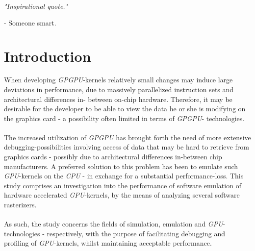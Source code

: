 \documentclass[fleqn,10pt]{SelfArx} %
\affiliation{EricNNilsson@gmail.com}
\newlength{\tocsep}
\begin{document}
\flushbottom %
\maketitle %

\noindent
\textit{"Inspirational quote."}
\begin{center}
- Someone smart.
\end{center}

\tableofcontents %
\thispagestyle{empty} %

\section*{Introduction} %
\label{sec:introduction}
When developing \textit{GPGPU}-kernels relatively small changes may induce large deviations in performance, due to massively parallelized instruction sets and architectural differences in-
between on-chip hardware. Therefore, it may be desirable for the developer to be able to view the data he or she is modifying on the graphics card - a possibility often limited in terms of \textit{GPGPU}-
technologies.\\
\\
The increased utilization of \textit{GPGPU} has brought forth the need of more extensive debugging-possibilities involving access of data that may be hard to retrieve from graphics cards - possibly due to architectural differences in-between chip manufacturers. A preferred solution to this problem has been to emulate such \textit{GPU}-kernels on the \textit{CPU} - in exchange for a substantial performance-loss. This study comprises an investigation into the performance of software emulation of hardware accelerated \textit{GPU}-kernels, by the means of analyzing several software rasterizers.\\
\\
As such, the study concerns the fields of simulation, emulation and \textit{GPU}-technologies - respectively, with the purpose of facilitating debugging and profiling of \textit{GPU}-kernels, whilst maintaining acceptable performance.
\end{document}

